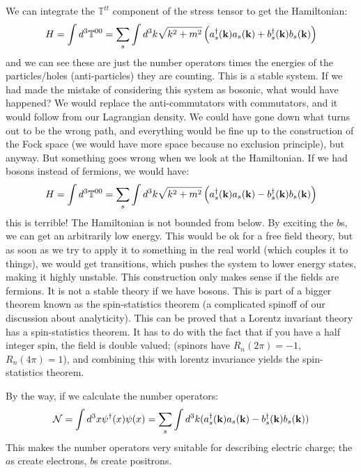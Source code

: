 We can integrate the $\mathbb{T}^{tt}$ component of the stress tensor to get the Hamiltonian:
\begin{equation}
    H = \int d^3 \mathbb{T}^{00} = \sum_s \int d^3k \sqrt{k^2 + m^2}\left(a_s^\dagger(\mathbf{k})a_s(\mathbf{k}) + b_s^\dagger(\mathbf{k})b_s(\mathbf{k})\right)
\end{equation}
and we can see these are just the number operators times the energies of the particles/holes (anti-particles) they are counting. This is a stable system. If we had made the mistake of considering this system as bosonic, what would have happened? We would replace the anti-commutators with commutators, and it would follow from our Lagrangian density. We could have gone down what turns out to be the wrong path, and everything would be fine up to the construction of the Fock space (we would have more space because no exclusion principle), but anyway. But something goes wrong when we look at the Hamiltonian. If we had bosons instead of fermions, we would have:
\begin{equation}
    H = \int d^3 \mathbb{T}^{00} = \sum_s \int d^3k \sqrt{k^2 + m^2}\left(a_s^\dagger(\mathbf{k})a_s(\mathbf{k}) - b_s^\dagger(\mathbf{k})b_s(\mathbf{k})\right)
\end{equation}
this is terrible! The Hamiltonian is not bounded from below. By exciting the $b$s, we can get an arbitrarily low energy. This would be ok for a free field theory, but as soon as we try to apply it to something in the real world (which couples it to things), we would get transitions, which pushes the system to lower energy states, making it highly unstable. This construction only makes sense if the fields are fermions. It is not a stable theory if we have bosons. This is part of a bigger theorem known as the spin-statistics theorem (a complicated spinoff of our discussion about analyticity). This can be proved that a Lorentz invariant theory has a spin-statistics theorem. It has to do with the fact that if you have a half integer spin, the field is double valued; (spinors have $R_n(2\pi) = -1$, $R_n(4\pi) = 1$), and combining this with lorentz invariance yields the spin-statistics theorem.

By the way, if we calculate the number operators:
\begin{equation}
    \mathcal{N} = \int d^3x \psi^\dagger(x)\psi(x) = \sum_s \int d^3k (a_s^\dagger(\mathbf{k})a_s(\mathbf{k}) - b_s^\dagger(\mathbf{k})b_s(\mathbf{k}))
\end{equation}
This makes the number operators very suitable for describing electric charge; the $a$s create electrons, $b$s create positrons.

